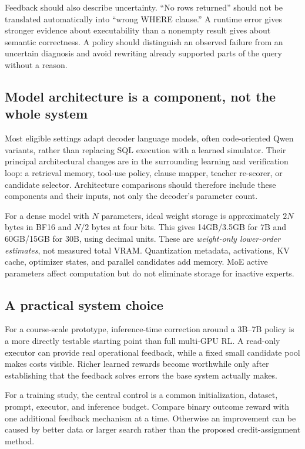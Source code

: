 \documentclass[11pt,a4paper]{article}
\begin{document}
Feedback should also describe uncertainty. ``No rows returned'' should not be translated automatically into ``wrong WHERE clause.'' A runtime error gives stronger evidence about executability than a nonempty result gives about semantic correctness. A policy should distinguish an observed failure from an uncertain diagnosis and avoid rewriting already supported parts of the query without a reason.

\subsection{Model architecture is a component, not the whole system}
Most eligible settings adapt decoder language models, often code-oriented Qwen variants, rather than replacing SQL execution with a learned simulator. Their principal architectural changes are in the surrounding learning and verification loop: a retrieval memory, tool-use policy, clause mapper, teacher re-scorer, or candidate selector. Architecture comparisons should therefore include these components and their inputs, not only the decoder's parameter count.

For a dense model with $N$ parameters, ideal weight storage is approximately $2N$ bytes in BF16 and $N/2$ bytes at four bits. This gives 14GB/3.5GB for 7B and 60GB/15GB for 30B, using decimal units. These are \emph{weight-only lower-order estimates}, not measured total VRAM. Quantization metadata, activations, KV cache, optimizer states, and parallel candidates add memory. MoE active parameters affect computation but do not eliminate storage for inactive experts.

\subsection{A practical system choice}
For a course-scale prototype, inference-time correction around a 3B--7B policy is a more directly testable starting point than full multi-GPU RL. A read-only executor can provide real operational feedback, while a fixed small candidate pool makes costs visible. Richer learned rewards become worthwhile only after establishing that the feedback solves errors the base system actually makes.

For a training study, the central control is a common initialization, dataset, prompt, executor, and inference budget. Compare binary outcome reward with one additional feedback mechanism at a time. Otherwise an improvement can be caused by better data or larger search rather than the proposed credit-assignment method.
\end{document}
